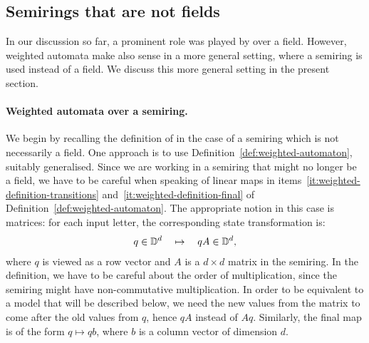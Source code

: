 \subsection{Semirings that are not fields}
\label{sec:beyond-fields}
\AP
In our discussion so far, a prominent role was played by  over
a field. However, weighted automata make also sense in a more general setting,
where a semiring is used instead of a field. We discuss this more general
setting in the present section.

\paragraph*{Weighted automata over a semiring.}
\AP We begin by recalling the definition of  in the case
of a semiring which is not necessarily a field. One approach is to use
Definition~\ref{def:weighted-automaton}, suitably generalised. Since we are
working in a semiring that might no longer be a field, we have to be careful
when speaking of linear maps in items~\ref{it:weighted-definition-transitions}
and~\ref{it:weighted-definition-final} of
Definition~\ref{def:weighted-automaton}. The appropriate notion in this case is
matrices: for each input letter, the corresponding state transformation is: 
\begin{align*}
q \in \mathbb D^d \quad \mapsto \quad qA \in \mathbb D^d,
\end{align*}
where $q$ is viewed as a row vector and $A$ is a $d \times d$ matrix in the semiring.
In the definition, we have to be careful about the order of multiplication,
since the semiring might have non-commutative multiplication. In order to be
equivalent to a model that will be described below,  we need the new values
from the matrix to come after the old values from $q$, hence $qA$ instead of
$Aq$.  Similarly, the final map is of the form $q \mapsto q b$, where $b$ is a
column vector of dimension $d$.


